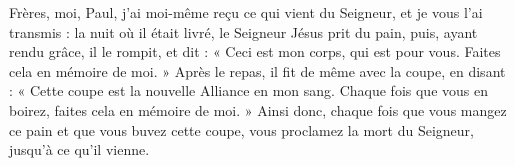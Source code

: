Frères,
moi, Paul, j’ai moi-même reçu ce qui vient du Seigneur,
et je vous l’ai transmis :
la nuit où il était livré,
le Seigneur Jésus prit du pain,
puis, ayant rendu grâce,
il le rompit, et dit :
« Ceci est mon corps, qui est pour vous.
Faites cela en mémoire de moi. »
Après le repas, il fit de même avec la coupe,
en disant :
« Cette coupe est la nouvelle Alliance en mon sang.
Chaque fois que vous en boirez,
faites cela en mémoire de moi. »
Ainsi donc, chaque fois que vous mangez ce pain
et que vous buvez cette coupe,
vous proclamez la mort du Seigneur,
jusqu’à ce qu’il vienne.
